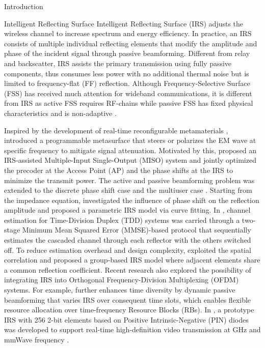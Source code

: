 \documentclass[journal]{IEEEtran}
\begin{document}
\begin{section}{Introduction}
		\begin{subsection}{Intelligent Reflecting Surface}
			Intelligent Reflecting Surface (IRS) adjusts the wireless channel to increase spectrum and energy efficiency. In practice, an IRS consists of multiple individual reflecting elements that modify the amplitude and phase of the incident signal through passive beamforming. Different from relay and backscatter, IRS assists the primary transmission using fully passive components, thus consumes less power with no additional thermal noise but is limited to frequency-flat (FF) reflection. Although Frequency-Selective Surface (FSS) has received much attention for wideband communications, it is different from IRS as active FSS requires RF-chains \cite{Kim2006} while passive FSS has fixed physical characteristics and is non-adaptive \cite{Anwar2018}.

			Inspired by the development of real-time reconfigurable metamaterials \cite{Cui2014}, \cite{Liaskos2018} introduced a programmable metasurface that steers or polarizes the EM wave at specific frequency to mitigate signal attenuation. Motivated by this, \cite{Wu2018} proposed an IRS-assisted Multiple-Input Single-Output (MISO) system and jointly optimized the precoder at the Access Point (AP) and the phase shifts at the IRS to minimize the transmit power. The active and passive beamforming problem was extended to the discrete phase shift case \cite{Wu2019a} and the multiuser case \cite{Wu2019}. Starting from the impedance equation, \cite{Abeywickrama2019} investigated the influence of phase shift on the reflection amplitude and proposed a parametric IRS model via curve fitting.	In \cite{Nadeem2019}, channel estimation for Time-Division Duplex (TDD) systems was carried through a two-stage Minimum Mean Squared Error (MMSE)-based protocol that sequentially estimates the cascaded channel through each reflector with the others switched off. To reduce estimation overhead and design complexity, \cite{Yang2019} exploited the spatial correlation and proposed a group-based IRS model where adjacent elements share a common reflection coefficient. Recent research also explored the possibility of integrating IRS into Orthogonal Frequency-Division Multiplexing (OFDM) systems. For example, \cite{Yang2020} further enhances time diversity by dynamic passive beamforming that varies IRS over consequent time slots, which enables flexible resource allocation over time-frequency Resource Blocks (RBs). In \cite{Dai2020}, a prototype IRS with \num{256} \num{2}-bit elements based on Positive Intrinsic-Negative (PIN) diodes was developed to support real-time high-definition video transmission at \si{GHz} and mmWave frequency \cite{Dai2020}.
		\end{subsection}



\end{section}
\end{document}
